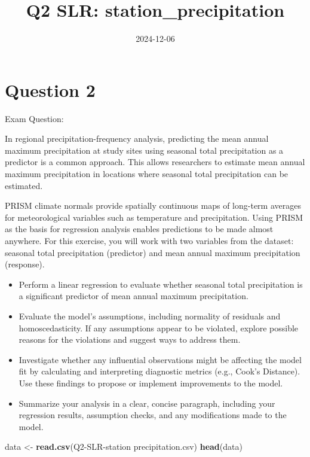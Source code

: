 \documentclass[
]{article}
\title{Q2 SLR: station\_precipitation}
\author{}
\date{\vspace{-2.5em}2024-12-06}
\newenvironment{Shaded}{\begin{snugshade}}{\end{snugshade}}
\newcommand{\FunctionTok}[1]{\textcolor[rgb]{0.13,0.29,0.53}{\textbf{#1}}}
\newcommand{\NormalTok}[1]{#1}
\newcommand{\OtherTok}[1]{\textcolor[rgb]{0.56,0.35,0.01}{#1}}
\newcommand{\StringTok}[1]{\textcolor[rgb]{0.31,0.60,0.02}{#1}}
\providecommand{\tightlist}{%
  \setlength{\itemsep}{0pt}\setlength{\parskip}{0pt}}
\begin{document}
\maketitle

\section{Question 2}\label{question-2}

Exam Question:

In regional precipitation-frequency analysis, predicting the mean annual
maximum precipitation at study sites using seasonal total precipitation
as a predictor is a common approach. This allows researchers to estimate
mean annual maximum precipitation in locations where seasonal total
precipitation can be estimated.

PRISM climate normals provide spatially continuous maps of long-term
averages for meteorological variables such as temperature and
precipitation. Using PRISM as the basis for regression analysis enables
predictions to be made almost anywhere. For this exercise, you will work
with two variables from the dataset: seasonal total precipitation
(predictor) and mean annual maximum precipitation (response).

\begin{itemize}
\tightlist
\item
  Perform a linear regression to evaluate whether seasonal total
  precipitation is a significant predictor of mean annual maximum
  precipitation.
\item
  Evaluate the model's assumptions, including normality of residuals and
  homoscedasticity. If any assumptions appear to be violated, explore
  possible reasons for the violations and suggest ways to address them.
\item
  Investigate whether any influential observations might be affecting
  the model fit by calculating and interpreting diagnostic metrics
  (e.g., Cook's Distance). Use these findings to propose or implement
  improvements to the model.
\item
  Summarize your analysis in a clear, concise paragraph, including your
  regression results, assumption checks, and any modifications made to
  the model.
\end{itemize}

\begin{Shaded}
\begin{Highlighting}[]
\NormalTok{data }\OtherTok{\textless{}{-}} \FunctionTok{read.csv}\NormalTok{(}\StringTok{\textquotesingle{}Q2{-}SLR{-}station precipitation.csv\textquotesingle{}}\NormalTok{)}
\FunctionTok{head}\NormalTok{(data)}
\end{Highlighting}
\end{Shaded}
\end{document}
